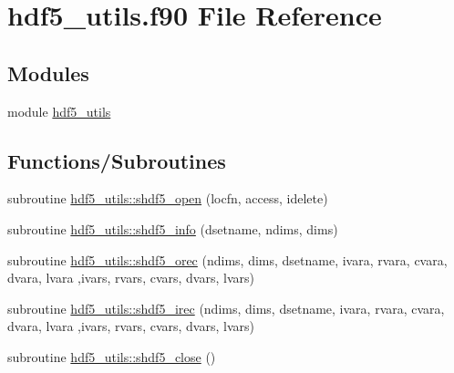 \hypertarget{hdf5__utils_8f90}{}\section{hdf5\+\_\+utils.\+f90 File Reference}
\label{hdf5__utils_8f90}
\subsection*{Modules}
\begin{DoxyCompactItemize}
\item 
module \hyperlink{namespacehdf5__utils}{hdf5\+\_\+utils}
\end{DoxyCompactItemize}
\subsection*{Functions/\+Subroutines}
\begin{DoxyCompactItemize}
\item 
subroutine \hyperlink{namespacehdf5__utils_a8324e53f06756f48c91f3735f9d26640}{hdf5\+\_\+utils\+::shdf5\+\_\+open} (locfn, access, idelete)
\item 
subroutine \hyperlink{namespacehdf5__utils_a5dbfd8881a533f6a96e2fe24a26b41e7}{hdf5\+\_\+utils\+::shdf5\+\_\+info} (dsetname, ndims, dims)
\item 
subroutine \hyperlink{namespacehdf5__utils_a5ac4831db37043197944d11e350994cf}{hdf5\+\_\+utils\+::shdf5\+\_\+orec} (ndims, dims, dsetname, ivara, rvara, cvara, dvara, lvara                                                                                                                                                                   ,ivars, rvars, cvars, dvars, lvars)
\item 
subroutine \hyperlink{namespacehdf5__utils_a3d95236f5d68305d35c4c0cf93daac70}{hdf5\+\_\+utils\+::shdf5\+\_\+irec} (ndims, dims, dsetname, ivara, rvara, cvara, dvara, lvara                                                                                                                                                                   ,ivars, rvars, cvars, dvars, lvars)
\item 
subroutine \hyperlink{namespacehdf5__utils_ac2a5ad4876fe382625c40cd9964ca3c1}{hdf5\+\_\+utils\+::shdf5\+\_\+close} ()
\end{DoxyCompactItemize}
